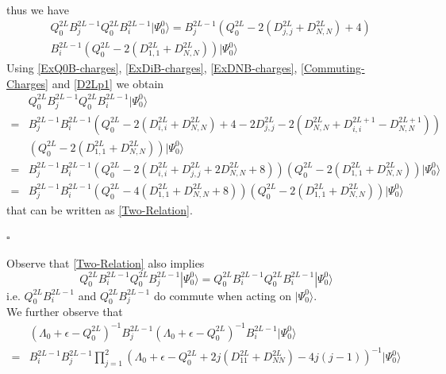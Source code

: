 \documentclass[10pt]{article}
\numberwithin{equation}{section}
\numberwithin{equation}{subsection}
\begin{document}
\begin{itemize}
\begin{align}
\end{align} 
thus we have 
\begin{align}
 &Q_{0}^{2L}B_{j}^{2L-1}Q_{0}^{2L}B_{i}^{2L-1}|\Psi_{0}^{0}\rangle=B_{j}^{2L-1}\left(Q_{0}^{2L}-2(D_{j,j}^{2L}+D_{N,N}^{2L})+4\right)\nonumber\\&B_{i}^{2L-1}\left(Q_{0}^{2L}-2(D_{1,1}^{2L}+D_{N,N}^{2L})\right)|\Psi_{0}^{0}\rangle
\end{align}
Using \eqref{ExQ0B-charges}, \eqref{ExDiB-charges}, \eqref{ExDNB-charges}, \eqref{Commuting-Charges} and \eqref{D2Lp1} we obtain 
\begin{align}
	&Q_{0}^{2L}B_{j}^{2L-1}Q_{0}^{2L}B_{i}^{2L-1}|\Psi_{0}^{0}\rangle\nonumber\\=&B_{j}^{2L-1}B_{i}^{2L-1}\left(Q_{0}^{2L}-2(D_{i,i}^{2L}+D_{N,N}^{2L})+4-2D_{j,j}^{2L}-2(D_{N,N}^{2L}+D_{i,i}^{2L+1}-D_{N,N}^{2L+1})\right)\nonumber\\&\left(Q_{0}^{2L}-2(D_{1,1}^{2L}+D_{N,N}^{2L})\right)|\Psi_{0}^{0}\rangle\nonumber
	\\=&
	B_{j}^{2L-1}B_{i}^{2L-1}\left(Q_{0}^{2L}-2(D_{i,i}^{2L}+D_{j,j}^{2L}+2D_{N,N}^{2L}+8)\right)\left(Q_{0}^{2L}-2(D_{1,1}^{2L}+D_{N,N}^{2L})\right)|\Psi_{0}^{0}\rangle\nonumber
	\\=&
	B_{j}^{2L-1}B_{i}^{2L-1}\left(Q_{0}^{2L}-4(D_{1,1}^{2L}+D_{N,N}^{2L}+8)\right)\left(Q_{0}^{2L}-2(D_{1,1}^{2L}+D_{N,N}^{2L})\right)|\Psi_{0}^{0}\rangle
\end{align}
that can be written as \eqref{Two-Relation}. 
\end{itemize}
\begin{flushright}
	$\square$
\end{flushright}
Observe that \eqref{Two-Relation} also implies
\begin{equation}\label{Commutativity-Gained}
	Q_{0}^{2L}B_{i}^{2L-1}Q_{0}^{2L}B_{j}^{2L-1}|\Psi_{0}^{0}\rangle=Q_{0}^{2L}B_{i}^{2L-1}Q_{0}^{2L}B_{i}^{2L-1}|\Psi_{0}^{0}\rangle
\end{equation}
i.e. $Q_{0}^{2L}B_{i}^{2L-1}$ and $Q_{0}^{2L}B_{j}^{2L-1}$ do commute when acting on $|\Psi_{0}^{0}\rangle$.\\
We further observe that 
\begin{align}\label{Two-Points-m1}
	&\left(\Lambda_{0}+\epsilon-Q_{0}^{2L}\right)^{-1}B_{j}^{2L-1}\left(\Lambda_{0}+\epsilon-Q_{0}^{2L}\right)^{-1}B_{i}^{2L-1}|\Psi_{0}^{0}\rangle\nonumber
	\\=&
	B_{i}^{2L-1}B_{j}^{2L-1}\prod_{j=1}^{2}\left(\Lambda_{0}+\epsilon-Q_{0}^{2L}+2j(D_{11}^{2L}+D_{NN}^{2L})-4j(j-1)\right)^{-1}|\Psi_{0}^{0}\rangle
\end{align}
\end{document}
